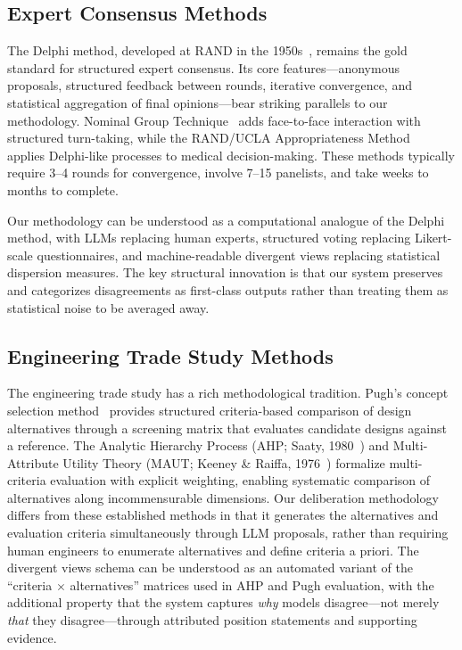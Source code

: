\documentclass[11pt,a4paper]{article}
\begin{document}
\subsection{Expert Consensus Methods}

The Delphi method, developed at RAND in the 1950s~\cite{linstone1975delphi,dalkey1963experimental}, remains the gold standard for structured expert consensus. Its core features---anonymous proposals, structured feedback between rounds, iterative convergence, and statistical aggregation of final opinions---bear striking parallels to our methodology. Nominal Group Technique~\cite{delbecq1975group} adds face-to-face interaction with structured turn-taking, while the RAND/UCLA Appropriateness Method~\cite{fitch2001rand} applies Delphi-like processes to medical decision-making. These methods typically require 3--4 rounds for convergence, involve 7--15 panelists, and take weeks to months to complete.

Our methodology can be understood as a computational analogue of the Delphi method, with LLMs replacing human experts, structured voting replacing Likert-scale questionnaires, and machine-readable divergent views replacing statistical dispersion measures. The key structural innovation is that our system preserves and categorizes disagreements as first-class outputs rather than treating them as statistical noise to be averaged away.

\subsection{Engineering Trade Study Methods}

The engineering trade study has a rich methodological tradition. Pugh's concept selection method~\cite{pugh1991total} provides structured criteria-based comparison of design alternatives through a screening matrix that evaluates candidate designs against a reference. The Analytic Hierarchy Process (AHP; Saaty, 1980~\cite{saaty1980ahp}) and Multi-Attribute Utility Theory (MAUT; Keeney \& Raiffa, 1976~\cite{keeney1976decisions}) formalize multi-criteria evaluation with explicit weighting, enabling systematic comparison of alternatives along incommensurable dimensions. Our deliberation methodology differs from these established methods in that it generates the alternatives and evaluation criteria simultaneously through LLM proposals, rather than requiring human engineers to enumerate alternatives and define criteria a priori. The divergent views schema can be understood as an automated variant of the ``criteria $\times$ alternatives'' matrices used in AHP and Pugh evaluation, with the additional property that the system captures \emph{why} models disagree---not merely \emph{that} they disagree---through attributed position statements and supporting evidence.
\end{document}
